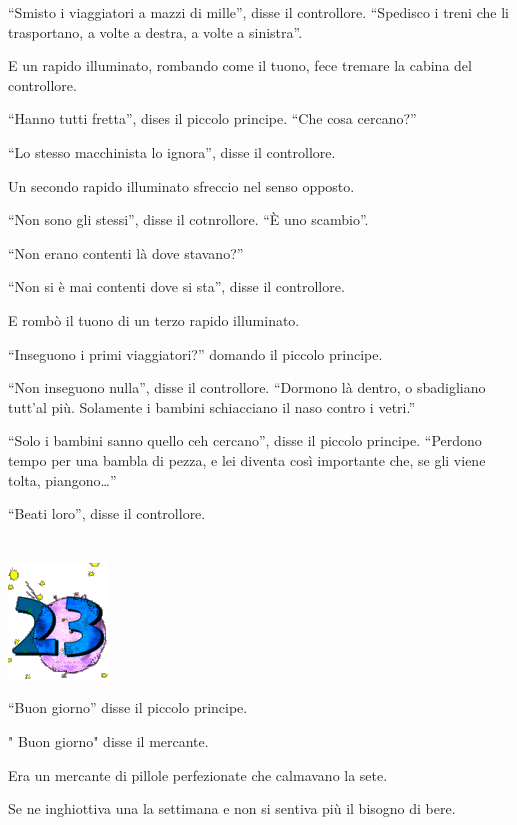\documentclass[11pt]{scrbook}
\begin{document}
``Smisto i viaggiatori a mazzi di mille'', disse il controllore.
``Spedisco i treni che li trasportano, a volte a destra, a volte a
sinistra''.

E un rapido illuminato, rombando come il tuono, fece tremare la cabina
del controllore.

``Hanno tutti fretta'', dises il piccolo principe. ``Che cosa cercano?''

``Lo stesso macchinista lo ignora'', disse il controllore.

Un secondo rapido illuminato sfreccio nel senso opposto.

``Non sono gli stessi'', disse il cotnrollore. ``È uno scambio''.

``Non erano contenti là dove stavano?''

``Non si è mai contenti dove si sta'', disse il controllore.

E rombò il tuono di un terzo rapido illuminato.

``Inseguono i primi viaggiatori?'' domando il piccolo principe.

``Non inseguono nulla'', disse il controllore. ``Dormono là dentro, o
sbadigliano tutt'al più. Solamente i bambini schiacciano il naso contro
i vetri.''

``Solo i bambini sanno quello ceh cercano'', disse il piccolo principe.
``Perdono tempo per una bambla di pezza, e lei diventa così importante
che, se gli viene tolta, piangono\ldots{}''

``Beati loro'', disse il controllore.

\chapter{}
\begin{center}
\includegraphics{./img/chapter23.png}
\end{center}

``Buon giorno'' disse il piccolo principe.

" Buon giorno" disse il mercante.

Era un mercante di pillole perfezionate che calmavano la sete.

Se ne inghiottiva una la settimana e non si sentiva più il bisogno di
bere.
\end{document}

